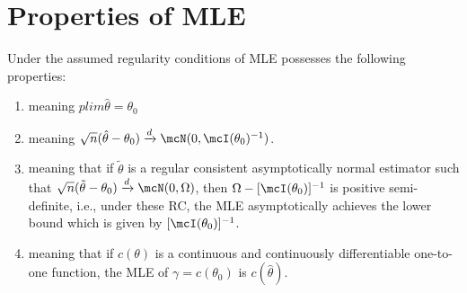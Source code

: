 \section{Properties of MLE}
Under the assumed regularity conditions of MLE possesses the following properties:
\begin{enumerate}
    \item {} meaning $plim\hat{\theta} = \theta_0$
    \item {} meaning $\sqrt{n}(\hat{\theta}-\theta_0)\xrightarrow{d}\mcN(0,\mcI(\theta_0)^{-1})$.
    \item {} meaning that if $\tilde{\theta}$ is a regular consistent asymptotically normal 
    estimator such that $\sqrt{n}(\tilde{\theta}-\theta_0)\xrightarrow{d}\mcN(0,\Omega)$,
    then $\Omega - [\mcI(\theta_0)]^{-1}$ is positive semi-definite, i.e.,
    under these RC, the MLE asymptotically achieves the  lower bound which is given by 
    $[\mcI(\theta_0)]^{-1}$.
    \item {} meaning that if $c(\theta)$ is a continuous and continuously differentiable one-to-one function,
    the MLE of $\gamma = c(\theta_0)$ is $c(\hat{\theta})$.
\end{enumerate}
